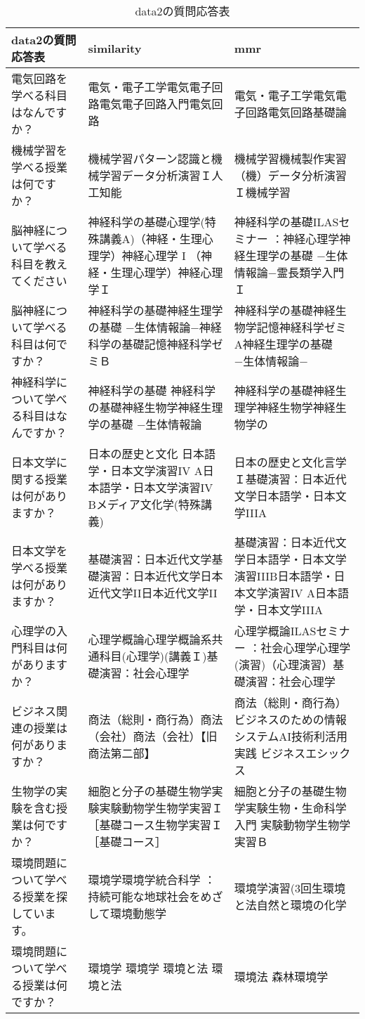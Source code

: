 \begin{table}[h!]
    \centering
    \begin{tabular}{|p{5cm}|p{5cm}|p{5cm}|}
        \hline
        data2の質問応答表 & similarity & mmr \\ \hline
        電気回路を学べる科目はなんですか？ & 電気・電子工学電気電子回路電気電子回路入門電気回路 & 電気・電子工学電気電子回路電気回路基礎論 \\ \hline
        機械学習を学べる授業は何ですか？ & 機械学習パターン認識と機械学習データ分析演習Ｉ人工知能 & 機械学習機械製作実習（機）データ分析演習Ｉ機械学習 \\ \hline
        脳神経について学べる科目を教えてください & 神経科学の基礎心理学(特殊講義A)（神経・生理心理学）神経心理学 I （神経・生理心理学）神経心理学Ｉ & 神経科学の基礎ILASセミナー ：神経心理学神経生理学の基礎 −生体情報論−霊長類学入門Ｉ \\ \hline
        脳神経について学べる科目は何ですか？ & 神経科学の基礎神経生理学の基礎 −生体情報論−神経科学の基礎記憶神経科学ゼミＢ & 神経科学の基礎神経生物学記憶神経科学ゼミA神経生理学の基礎 −生体情報論− \\ \hline
        神経科学について学べる科目はなんですか？ & 神経科学の基礎 神経科学の基礎神経生物学神経生理学の基礎 −生体情報論 & 神経科学の基礎神経生理学神経生物学神経生物学の \\ \hline
        日本文学に関する授業は何がありますか？ & 日本の歴史と文化 日本語学・日本文学演習IV A日本語学・日本文学演習IV Bメディア文化学(特殊講義) & 日本の歴史と文化言学Ｉ基礎演習：日本近代文学日本語学・日本文学IIIA \\ \hline
        日本文学を学べる授業は何がありますか？ & 基礎演習：日本近代文学基礎演習：日本近代文学日本近代文学II日本近代文学II & 基礎演習：日本近代文学日本語学・日本文学演習IIIB日本語学・日本文学演習IV A日本語学・日本文学IIIA \\ \hline
        心理学の入門科目は何がありますか？ & 心理学概論心理学概論系共通科目(心理学)(講義Ｉ)基礎演習：社会心理学 & 心理学概論ILASセミナー ：社会心理学心理学(演習)（心理演習）基礎演習：社会心理学 \\ \hline
        ビジネス関連の授業は何がありますか？ & 商法（総則・商行為）商法（会社）商法（会社）【旧商法第二部】 & 商法（総則・商行為）ビジネスのための情報システムAI技術利活用実践 ビジネスエシックス \\ \hline
        生物学の実験を含む授業は何ですか？ & 細胞と分子の基礎生物学実験実験動物学生物学実習Ｉ ［基礎コース生物学実習Ｉ ［基礎コース］ & 細胞と分子の基礎生物学実験生物・生命科学入門 実験動物学生物学実習Ｂ \\ \hline
        環境問題について学べる授業を探しています。 & 環境学環境学統合科学 ：持続可能な地球社会をめざして環境動態学 & 環境学演習(3回生環境と法自然と環境の化学 \\ \hline
        環境問題について学べる授業は何ですか？ & 環境学 環境学 環境と法 環境と法 & 環境法 森林環境学 \\ \hline
    \end{tabular}
    \caption{data2の質問応答表}
\end{table}

